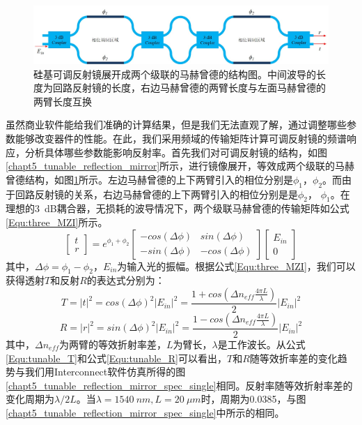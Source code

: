 \begin{figure}[htb]
	\centering
	\includegraphics[width=15cm]{./Pictures/chapt5_tunable_reflection_mirror_flatten.jpg}
	\caption{硅基可调反射镜展开成两个级联的马赫曾德的结构图。中间波导的长度为回路反射镜的长度，右边马赫曾德的两臂长度与左面马赫曾德的两臂长度互换}
	\label{chapt5_tunable_reflection_mirror_flatten}
\end{figure}
虽然商业软件能给我们准确的计算结果，但是我们无法直观了解，通过调整哪些参数能够改变器件的性能。在此，我们采用频域的传输矩阵计算可调反射镜的频谱响应，分析具体哪些参数能影响反射率。首先我们对可调反射镜的结构，如图\ref{chapt5_tunable_reflection_mirror}所示，进行镜像展开，等效成两个级联的马赫曾德结构，如图\ref{chapt5_tunable_reflection_mirror_flatten}所示。左边马赫曾德的上下两臂引入的相位分别是$\phi_1$，$\phi_2$。而由于回路反射镜的关系，右边马赫曾德的上下两臂引入的相位分别是是$\phi_2$， $\phi_1$。在理想的3~dB耦合器，无损耗的波导情况下，两个级联马赫曾德的传输矩阵如公式\ref{Equ:three_MZI}所示。
\begin{equation}
\label{Equ:three_MZI}
\begin{bmatrix}
t\\
r
\end{bmatrix}
= e^{\phi_1+\phi_2}
\begin{bmatrix}
-cos(\Delta \phi) & sin(\Delta \phi)\\
-sin(\Delta \phi) & -cos(\Delta \phi)
\end{bmatrix}
\begin{bmatrix}
E_{in}\\
0
\end{bmatrix}
\end{equation}
其中，$\Delta \phi = \phi_1-\phi_2$，$E_{in}$为输入光的振幅。根据公式\ref{Equ:three_MZI}，我们可以获得透射$T$和反射$R$的表达式分别为：
\begin{equation}
\label{Equ:tunable_T}
T = |t|^2 = cos(\Delta \phi)^2 |E_{in}|^2 = \frac{1+cos(\Delta n_{eff}\frac{4\pi L}{\lambda})}{2}|E_{in}|^2
\end{equation}
\begin{equation}
\label{Equ:tunable_R}
R = |r|^2 = sin(\Delta \phi)^2 |E_{in}|^2= \frac{1-cos(\Delta n_{eff}\frac{4\pi L}{\lambda})}{2}|E_{in}|^2
\end{equation}
其中，$\Delta n_{eff}$为两臂的等效折射率差，$L$为臂长，$\lambda$是工作波长。从公式\ref{Equ:tunable_T}和公式\ref{Equ:tunable_R}可以看出，$T$和$R$随等效折率差的变化趋势与我们用Interconnect软件仿真所得的图\ref{chapt5_tunable_reflection_mirror_spec_single}相同。反射率随等效折射率差的变化周期为$\lambda/2L$。当$\lambda = 1540~nm, L = 20~\mu m$时，周期为0.0385，与图\ref{chapt5_tunable_reflection_mirror_spec_single}中所示的相同。

